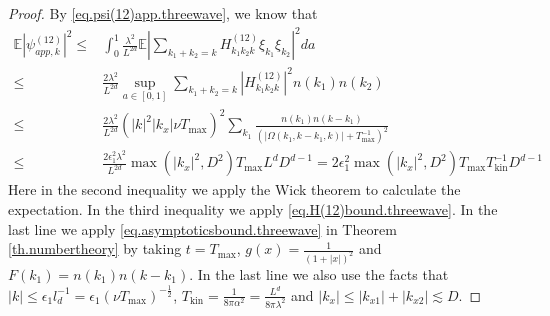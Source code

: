 \begin{proof}
By \eqref{eq.psi(12)app.threewave}, we know that 
\begin{equation}\label{eq.psi(12)bound.threewave}
\begin{split}
    \mathbb E \left|\psi^{(12)}_{app,k}\right|^2\le& \int^1_{0}\frac{\lambda^2}{L^{2d}} \mathbb E\left|\sum\limits_{k_1+k_2=k} H^{(12)}_{k_1k_2k}\xi_{k_1} \xi_{k_2}\right|^2 da 
    \\
    \le& \frac{2\lambda^2}{L^{2d}} \sup_{a\in[0,1]}\sum\limits_{k_1+k_2=k} \left|H^{(12)}_{k_1k_2k}\right|^2n(k_1) n(k_2)
    \\
    \le& \frac{2\lambda^2}{L^{2d}} (|k|^2|k_x|\nu T_{\text{max}})^2 \sum\limits_{k_1} \frac{n(k_1) n(k-k_1)}{(|\Omega(k_1,k-k_1,k)|+T^{-1}_{\text{max}})^2}
    \\
    \le& \frac{2\epsilon_1^2\lambda^2}{L^{2d}} \max(|k_x|^2,D^2) T_{\text{max}} L^dD^{d-1}=2\epsilon_1^2 \max(|k_x|^2,D^2) T_{\text{max}} T^{-1}_{\text{kin}}D^{d-1} 
\end{split}   
\end{equation}
Here in the second inequality we apply the Wick theorem to calculate the expectation. In the third inequality we apply \eqref{eq.H(12)bound.threewave}. In the last line we apply \eqref{eq.asymptoticsbound.threewave} in Theorem \ref{th.numbertheory} by taking $t=T_{\text{max}}$, $g(x)=\frac{1}{(1+|x|)^2}$ and $F(k_1)=n(k_1) n(k-k_1)$. In the last line we also use the facts that $|k|\le \epsilon_1 l_{d}^{-1}=\epsilon_1 (\nu T_{\text{max}})^{-\frac{1}{2}}$, $T_{\text{kin}}=\frac{1}{8\pi\alpha^2}=\frac{L^{d}}{8\pi\lambda^2}$ and $|k_x|\le |k_{x1}|+|k_{x2}|\lesssim D$.


\end{proof}
